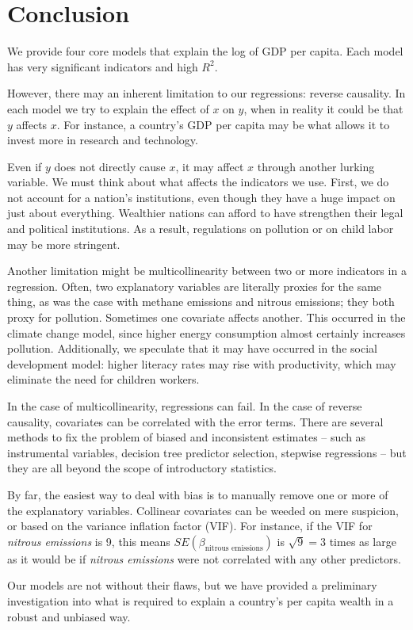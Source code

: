 \documentclass[11pt]{article}
\begin{document}
\section{Conclusion}
\label{sec:conclusion}
We provide four core models that explain the log of GDP per capita. Each model has very significant indicators and high $R^2$.

However, there may an inherent limitation to our regressions: reverse causality.
In each model we try to explain the effect of $x$ on $y$, when in reality it could be that $y$ affects $x$. For instance, a country's GDP per capita may be what allows it to invest more in research and technology.

Even if $y$ does not directly cause $x$, it may affect $x$ through another lurking variable. We must think about what affects the indicators we use. First, we do not account for a nation's institutions, even though they have a huge impact on just about everything. Wealthier nations can afford to have strengthen their legal and political institutions. As a result, regulations on pollution or on child labor may be more stringent.

Another limitation might be multicollinearity between two or more indicators in a regression. Often, two explanatory variables are literally proxies for the same thing, as was the case with methane emissions and nitrous emissions; they both proxy for pollution. Sometimes one covariate affects another. This occurred in the climate change model, since higher energy consumption almost certainly increases pollution. Additionally, we speculate that it may have occurred in the social development model: higher literacy rates may rise with productivity, which may eliminate the need for children workers.

In the case of multicollinearity, regressions can fail. In the case of reverse causality, covariates can be correlated with the error terms. There are several methods to fix the problem of biased and inconsistent estimates -- such as instrumental variables, decision tree predictor selection, stepwise regressions -- but they are all beyond the scope of introductory statistics.

By far, the easiest way to deal with bias is to manually remove one or more of the explanatory variables. Collinear covariates can be weeded on mere suspicion, or based on the variance inflation factor (VIF). For instance, if the VIF for \emph{nitrous emissions} is 9, this means $SE(\beta_{\textrm{nitrous emissions}})$ is $\sqrt{9} = 3$ times as large as it would be if \emph{nitrous emissions} were not correlated with any other predictors.

Our models are not without their flaws, but we have provided a preliminary investigation into what is required to explain a country's per capita wealth in a robust and unbiased way.



\theendnotes
\end{document}
